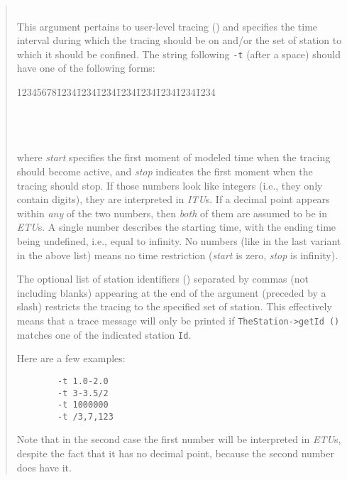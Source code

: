 \begin{quote}
\noindent{}\\ \hspace{0in}
This argument pertains to user-level tracing () and
specifies the time interval during which the tracing should be on and/or
the set of station to which it should be confined.
The string following {\tt -t} (after a space) should have one of the following
forms:

{\tt\begin{tabbing}
12345678\=1234\=1234\=1234\=1234\=1234\=1234\=1234\=1234\kill
{} \\
 \\
 \\
 \\
\end{tabbing}}
\noindent
where {\em start\/} specifies the first moment of modeled time when the tracing
should become active, and {\em stop\/} indicates
the first moment when the tracing should stop.
If those numbers look like integers (i.e., they only contain digits), they are
interpreted in {\em ITU\/}s.
If a decimal point appears within {\em any\/}
of the two numbers, then {\em both\/} of them
are assumed to be in {\em ETU\/}s.
A single number describes the starting time, with the ending time being
undefined, i.e., equal to infinity.
No numbers (like in the last variant in the above list) means no time
restriction ({\em start\/} is zero, {\em stop\/} is infinity).

The optional list of station identifiers () separated
by commas (not including blanks) appearing at the end of
the argument (preceded by a slash) restricts the tracing to the specified set
of station.
This effectively means that a trace message will only be printed if
{\tt TheStation->getId}~{\tt ()} matches one of the indicated station
{\tt Id}.

Here are a few examples:
\begin{verbatim}
        -t 1.0-2.0
        -t 3-3.5/2
        -t 1000000
        -t /3,7,123
\end{verbatim}
\noindent
Note that in the second case the first number will be interpreted in
{\em ETU\/}s, despite the fact that it has no decimal point, because the
second number does have it.


\end{quote}
